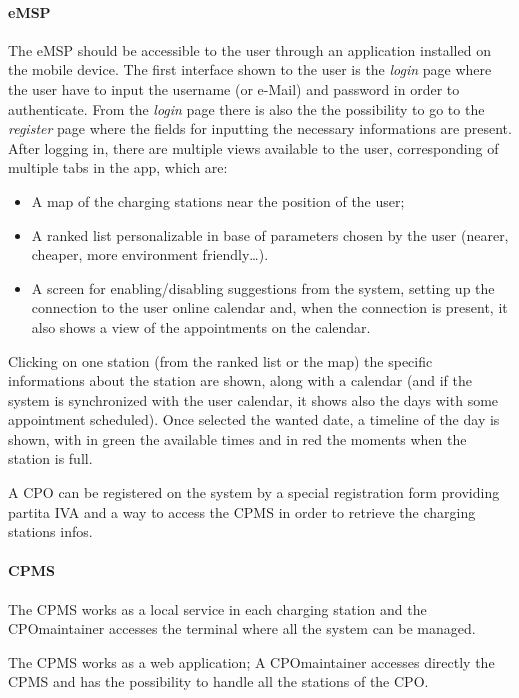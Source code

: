 \paragraph{\ac{eMSP}}
The \ac{eMSP} should be accessible to the user through an application installed on the mobile device.
The first interface shown to the user is the \textit{login} page where the user have to input the username (or e-Mail) and password in order to authenticate.
From the \textit{login} page there is also the the possibility to go to the \textit{register} page where the fields for inputting the necessary informations are present.
After logging in, there are multiple views available to the user, corresponding of multiple tabs in the app, which are:
\begin{itemize}
    \item A map of the charging stations near the position of the user;
    \item A ranked list personalizable in base of parameters chosen by the user (nearer, cheaper, more environment friendly\ldots).
    \item A screen for enabling/disabling suggestions from the system, setting up the connection to the user online calendar and, when the connection is present, it also shows a view of the appointments on the calendar.
\end{itemize}
Clicking on one station (from the ranked list or the map) the specific informations about the station are shown, along with a calendar (and if the system is synchronized with the user calendar, it shows also the days with some appointment scheduled). Once selected the wanted date, a timeline of  the day is shown, with in green the available times and in red the moments when the station is full.

A \ac{CPO} can be registered on the system by a special registration form providing partita IVA and a way to access the \ac{CPMS} in order to retrieve the charging stations infos.

\paragraph{\ac{CPMS}}
The \ac{CPMS} works as a local service in each charging station and the \ac{CPO}maintainer accesses the terminal where all the system can be managed. 

The \ac{CPMS} works as a web application; A \ac{CPO}maintainer accesses directly the \ac{CPMS} and has the possibility to handle all the stations of the \ac{CPO}.

